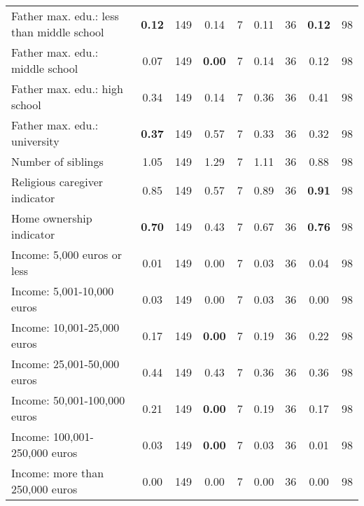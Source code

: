 \begin{tabular}{l c c c c c c c c}
Father max. edu.: less than middle school & \textbf{     0.12} &       149 &      0.14 &         7 &      0.11 &        36 & \textbf{     0.12} &        98 \\
Father max. edu.: middle school &      0.07 &       149 & \textbf{     0.00} &         7 &      0.14 &        36 &      0.12 &        98 \\
Father max. edu.: high school &      0.34 &       149 &      0.14 &         7 &      0.36 &        36 &      0.41 &        98 \\
Father max. edu.: university & \textbf{     0.37} &       149 &      0.57 &         7 &      0.33 &        36 &      0.32 &        98 \\
Number of siblings &      1.05 &       149 &      1.29 &         7 &      1.11 &        36 &      0.88 &        98 \\
Religious caregiver indicator &      0.85 &       149 &      0.57 &         7 &      0.89 &        36 & \textbf{     0.91} &        98 \\
Home ownership indicator & \textbf{     0.70} &       149 &      0.43 &         7 &      0.67 &        36 & \textbf{     0.76} &        98 \\
Income: 5,000 euros or less &      0.01 &       149 &      0.00 &         7 &      0.03 &        36 &      0.04 &        98 \\
Income: 5,001-10,000 euros &      0.03 &       149 &      0.00 &         7 &      0.03 &        36 &      0.00 &        98 \\
Income: 10,001-25,000 euros &      0.17 &       149 & \textbf{     0.00} &         7 &      0.19 &        36 &      0.22 &        98 \\
Income: 25,001-50,000 euros &      0.44 &       149 &      0.43 &         7 &      0.36 &        36 &      0.36 &        98 \\
Income: 50,001-100,000 euros &      0.21 &       149 & \textbf{     0.00} &         7 &      0.19 &        36 &      0.17 &        98 \\
Income: 100,001-250,000 euros &      0.03 &       149 & \textbf{     0.00} &         7 &      0.03 &        36 &      0.01 &        98 \\
Income: more than 250,000 euros &      0.00 &       149 &      0.00 &         7 &      0.00 &        36 &      0.00 &        98 \\
\bottomrule
\end{tabular}
